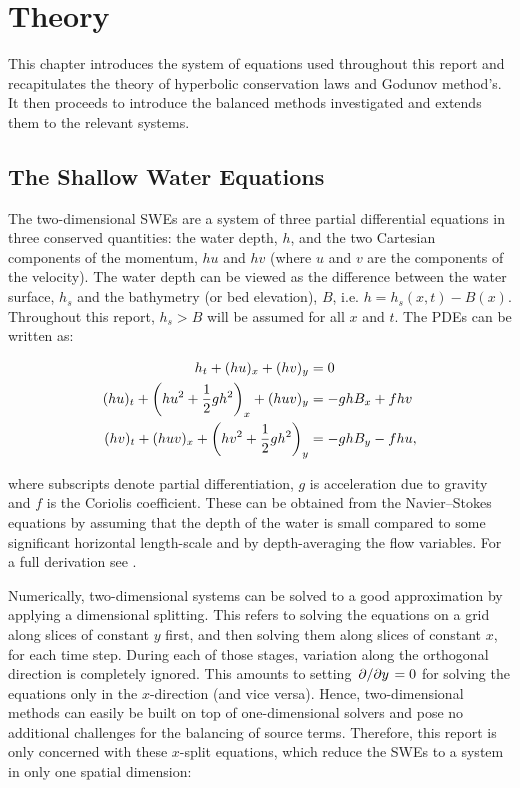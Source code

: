 \chapter{Theory}
\label{ch:theory}

This chapter introduces the system of equations used throughout this report and recapitulates the theory of hyperbolic conservation laws and Godunov method's. It then proceeds to introduce the balanced methods investigated and extends them to the relevant systems.

\section{The Shallow Water Equations}

The two-dimensional SWEs are a system of three partial differential equations in three conserved quantities: the water depth, $h$, and the two Cartesian components of the momentum, $hu$ and $hv$ (where $u$ and $v$ are the components of the velocity). The water depth can be viewed as the difference between the water surface, $h_s$ and the bathymetry (or bed elevation), $B$, i.e. $h = h_s(x,t) - B(x)$. Throughout this report, $h_s > B$ will be assumed for all $x$ and $t$. The PDEs can be written as:

\begin{subequations}
  \begin{align}
                            h_t + (hu)_x + (hv)_y & = 0 \\
    (hu)_t + \qty(hu^2 + \frac{1}{2}gh^2)_x + (huv)_y & = - ghB_x + fhv \\
    (hv)_t + (huv)_x + \qty(hv^2 + \frac{1}{2}gh^2)_y & = - ghB_y - fhu,
  \end{align}
\end{subequations}

where subscripts denote partial differentiation, $g$ is acceleration due to gravity and $f$ is the Coriolis coefficient. These can be obtained from the Navier--Stokes equations by assuming that the depth of the water is small compared to some significant horizontal length-scale and by depth-averaging the flow variables. For a full derivation see \citet{dellar2005shallow}.

Numerically, two-dimensional systems can be solved to a good approximation by applying a dimensional splitting. This refers to solving the equations on a grid along slices of constant $y$ first, and then solving them along slices of constant $x$, for each time step. During each of those stages, variation along the orthogonal direction is completely ignored. This amounts to setting $\pdv*{y} = 0$ for solving the equations only in the $x$-direction (and vice versa). Hence, two-dimensional methods can easily be built on top of one-dimensional solvers and pose no additional challenges for the balancing of source terms. Therefore, this report is only concerned with these $x$-split equations, which reduce the SWEs to a system in only one spatial dimension:

